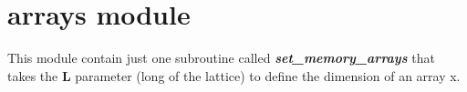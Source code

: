 \section{arrays module}

This module contain just one subroutine called \textit{\textbf{set\_memory\_arrays}} that takes the \textbf{L} parameter (long of the lattice) to define the dimension of an array x.
